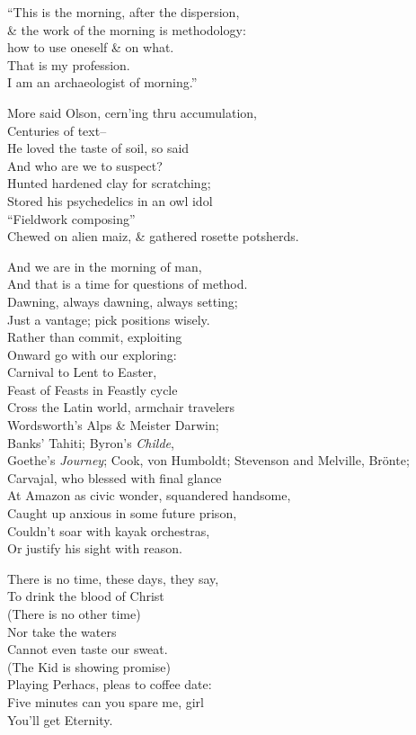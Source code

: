 ``This is the morning, after the dispersion, \\
\& the work of the morning is methodology: \\
how to use oneself \& on what. \\
That is my profession. \\
I am an archaeologist of morning.''

More said Olson, cern'ing thru accumulation, \\
Centuries of text-- \\
He loved the taste of soil, so said \\
And who are we to suspect? \\
Hunted hardened clay for scratching; \\
Stored his psychedelics in an owl idol \\
``Fieldwork composing'' \\
Chewed on alien maiz, \& gathered rosette potsherds.

And we are in the morning of man, \\
And that is a time for questions of method. \\
Dawning, always dawning, always setting; \\
Just a vantage; pick positions wisely. \\
Rather than commit, exploiting \\
Onward go with our exploring: \\
Carnival to Lent to Easter, \\
Feast of Feasts in Feastly cycle \\
Cross the Latin world, armchair travelers \\
Wordsworth's Alps \& Meister Darwin; \\
Banks' Tahiti; Byron's \textit{Childe}, \\
Goethe's \textit{Journey}; Cook, von Humboldt;
Stevenson and Melville, Brönte; \\
Carvajal, who blessed with final glance \\
At Amazon as civic wonder, squandered handsome, \\ 
Caught up anxious in some future prison, \\
Couldn't soar with kayak orchestras, \\
Or justify his sight with reason.

There is no time, these days, they say, \\
To drink the blood of Christ \\
(There is no other time) \\
Nor take the waters \\
Cannot even taste our sweat. \\
(The Kid is showing promise) \\
Playing Perhacs, pleas to coffee date: \\
Five minutes can you spare me, girl \\
You'll get Eternity.

